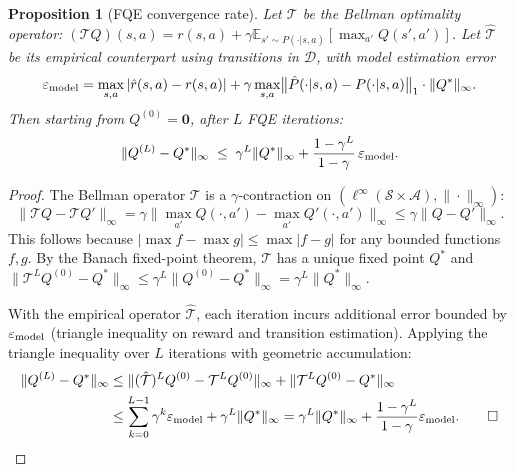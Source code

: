 \documentclass[10pt]{article}
\theoremstyle{plain}
\newtheorem{proposition}[theorem]{Proposition}
\theoremstyle{definition}
\theoremstyle{remark}
\newcommand{\E}{\mathbb{E}}
\newcommand{\calS}{\mathcal{S}}
\newcommand{\calA}{\mathcal{A}}
\newcommand{\calD}{\mathcal{D}}
\begin{document}
\begin{proposition}[FQE convergence rate]
  \label{prop:fqe_convergence}
  Let $\mathcal{T}$ be the Bellman optimality operator:
  $(\mathcal{T}Q)(s,a)=r(s,a)+\gamma\E_{s'\sim P(\cdot|s,a)}[\max_{a'}Q(s',a')]$.
  Let $\hat{\mathcal{T}}$ be its empirical counterpart using transitions in
  $\calD$, with model estimation error
  \begin{equation}
    \varepsilon_{\rm model} = \max_{s,a}\left|\hat{r}(s,a)-r(s,a)\right|
    + \gamma \max_{s,a}\bigl\|\hat{P}(\cdot|s,a)-P(\cdot|s,a)\bigr\|_1
      \cdot\|Q^*\|_\infty.
    \label{eq:model_err}
  \end{equation}
  Then starting from $Q^{(0)}=\mathbf{0}$, after $L$ FQE iterations:
  \begin{equation}
    \|Q^{(L)}-Q^*\|_\infty
    \;\leq\; \gamma^L\|Q^*\|_\infty
    + \frac{1-\gamma^L}{1-\gamma}\,\varepsilon_{\rm model}.
    \label{eq:fqe_conv}
  \end{equation}
\end{proposition}

\begin{proof}
  The Bellman operator $\mathcal{T}$ is a $\gamma$-contraction on
  $(\ell^\infty(\calS\times\calA),\|\cdot\|_\infty)$:
  \begin{equation}
    \|\mathcal{T}Q-\mathcal{T}Q'\|_\infty
    = \gamma\|\max_{a'}Q(\cdot,a')-\max_{a'}Q'(\cdot,a')\|_\infty
    \leq\gamma\|Q-Q'\|_\infty.
  \end{equation}
  This follows because $|\max f - \max g|\leq\max|f-g|$ for any bounded
  functions $f,g$.  By the Banach fixed-point theorem, $\mathcal{T}$ has a
  unique fixed point $Q^*$ and $\|\mathcal{T}^L Q^{(0)} - Q^*\|_\infty
  \leq \gamma^L\|Q^{(0)}-Q^*\|_\infty = \gamma^L\|Q^*\|_\infty$.

  With the empirical operator $\hat{\mathcal{T}}$, each iteration incurs
  additional error bounded by $\varepsilon_{\rm model}$ (triangle inequality
  on reward and transition estimation).  Applying the triangle inequality
  over $L$ iterations with geometric accumulation:
  \begin{align}
    \|Q^{(L)}-Q^*\|_\infty
    &\leq \|(\hat{\mathcal{T}})^L Q^{(0)}-\mathcal{T}^L Q^{(0)}\|_\infty
    + \|\mathcal{T}^L Q^{(0)}-Q^*\|_\infty\\
    &\leq \sum_{k=0}^{L-1}\gamma^k\varepsilon_{\rm model}
    + \gamma^L\|Q^*\|_\infty
    = \gamma^L\|Q^*\|_\infty + \frac{1-\gamma^L}{1-\gamma}\varepsilon_{\rm model}.\qed
  \end{align}
\end{proof}
\end{document}

